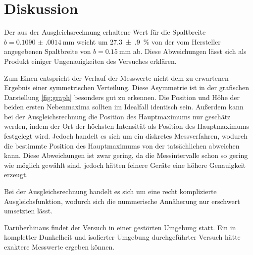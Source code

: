 \section{Diskussion}
\label{sec:Diskussion}
Der aus der Ausgleichsrechnung erhaltene Wert für die Spaltbreite $b = \SI{0.1090(0014)}{\milli\meter}$ weicht um \SI{27.3(9)}{\percent} von der vom Hersteller angegebenen Spaltbreite von $b = \SI{0.15}{\milli\meter}$ ab. Diese Abweichungen lässt sich als Produkt einiger Ungenauigkeiten des Versuches erklären. 

Zum Einen entspricht der Verlauf der Messwerte nicht dem zu erwartenen Ergebnis einer symmetrischen Verteilung. Diese Asymmetrie ist in der grafischen Darstellung \ref{fig:graph} besonders gut zu erkennen. Die Position und Höhe der beiden ersten Nebenmaxima sollten im Idealfall identisch sein. Außerdem kann bei der Ausgleichsrechnung die Position des Hauptmaximums nur geschätz werden, indem der Ort der höchsten Intensität als Position des Hauptmaximums festgelegt wird. Jedoch handelt es sich um ein diskretes Messverfahren, wodurch die bestimmte Position des Hauptmaximums von der tatsächlichen abweichen kann. Diese Abweichungen ist zwar gering, da die Messintervalle schon so gering wie möglich gewählt sind, jedoch hätten feinere Geräte eine höhere Genauigkeit erzeugt. 

Bei der Ausgleichsrechnung handelt es sich um eine recht komplizierte Ausgleichsfunktion, wodurch sich die nummerische Annäherung nur erschwert umsetzten lässt. 

Darüberhinaus findet der Versuch in einer gestörten Umgebung statt. Ein in kompletter Dunkelheit und isolierter Umgebung durchgeführter Versuch hätte exaktere Messwerte ergeben können.


